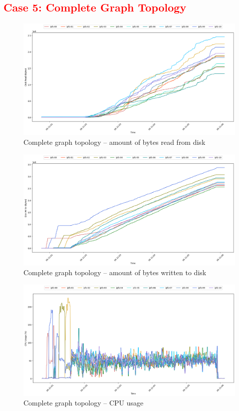 \subsection{\textcolor{red}{Case 5: Complete Graph Topology}}

\begin{figure}[H]
\includegraphics[width=\linewidth]{figures/graph-complete/blk_read.png}
\caption{Complete graph topology -- amount of bytes read from disk}
\end{figure}
\begin{figure}[H]
\includegraphics[width=\linewidth]{figures/graph-complete/blk_write.png}
\caption{Complete graph topology -- amount of bytes written to disk}
\end{figure}
\begin{figure}[H]
\includegraphics[width=\linewidth]{figures/graph-complete/cpu_usage.png}
\caption{Complete graph topology -- CPU usage}
\end{figure}
